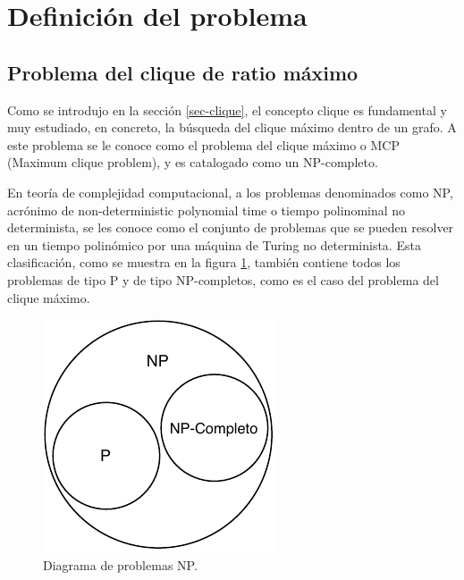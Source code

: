 \section{Definición del problema}

\subsection{Problema del clique de ratio máximo}
\label{intro-problema}
Como se introdujo en la sección \ref{sec-clique}, el concepto clique es fundamental y muy estudiado, en concreto, la búsqueda del clique máximo dentro de un grafo. A este problema se le conoce como el problema del clique máximo o \gls{MCP} (Maximum clique problem), y es catalogado como un NP-completo.

En teoría de complejidad computacional, a los problemas denominados como NP, acrónimo de non-deterministic polynomial time o tiempo polinominal no determinista, se les conoce como el conjunto de problemas que se pueden resolver en un tiempo polinómico por una máquina de Turing no determinista. Esta clasificación, como se muestra en la figura \ref{fig:problemas-np}, también contiene todos los problemas de tipo P y de tipo NP-completos, como es el caso del problema del clique máximo.

\begin{figure}[H]
	\centering
	\includegraphics{Figures/problemas-np.pdf}
	\caption{Diagrama de problemas NP.}
	\label{fig:problemas-np}
\end{figure}

